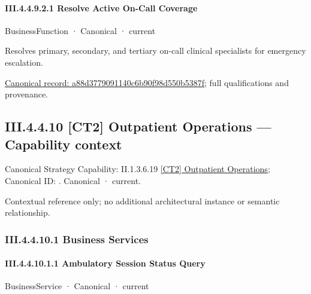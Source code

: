 \paragraph*{III.4.4.9.2.1 Resolve Active On-Call Coverage}
\label{navigation:III.4.4.9.2.1}

\label{element:a88d3779091140c6b90f98d550b5387f}
{\small BusinessFunction · Canonical · current}\par

Resolves primary, secondary, and tertiary on-call clinical specialists for emergency escalation.


{\footnotesize \href{../../../../continuum/business/business-function/a88d3779091140c6b90f98d550b5387f.md}{Canonical record: a88d3779091140c6b90f98d550b5387f}; full qualifications and provenance.}\par
\subsection*{III.4.4.10 [CT2] Outpatient Operations — Capability context}
\label{navigation:III.4.4.10}

{\small Canonical Strategy Capability: II.1.3.6.19 \hyperref[element:21399d52b9624ddfbeb786f1d72e40c3]{[CT2] Outpatient Operations}; Canonical ID: \texttt{}. Canonical · current.}\par
Contextual reference only; no additional architectural instance or semantic relationship.\par
\subsubsection*{III.4.4.10.1 Business Services}
\label{navigation:III.4.4.10.1}

\paragraph*{III.4.4.10.1.1 Ambulatory Session Status Query}
\label{navigation:III.4.4.10.1.1}

\label{element:a790a785f2e148d7a1c99655d53db4e9}
{\small BusinessService · Canonical · current}\par

